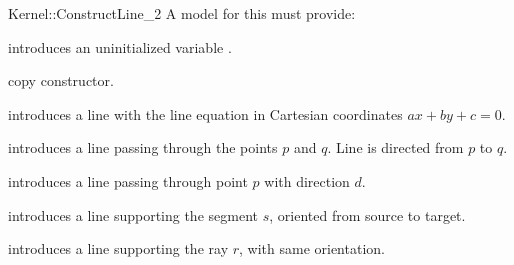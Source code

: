 \begin{ccRefFunctionObjectConcept}{Kernel::ConstructLine_2}
A model for this must provide:


\ccHidden {}
             {introduces an uninitialized variable .}

\ccHidden {}
 	    {copy constructor.}

            {introduces a line  with the line equation in Cartesian
	      coordinates $ax +by +c = 0$.}

            {introduces a line  passing through the points $p$ and $q$. 
             Line  is directed from $p$ to $q$.}

            {introduces a line  passing through point $p$ with 
             direction $d$.}

            {introduces a line  supporting the segment $s$,
	    oriented from source to target.}

            {introduces a line  supporting the ray $r$,
	    with same orientation.}

\ccSeeAlso
{}  \\

\end{ccRefFunctionObjectConcept}
